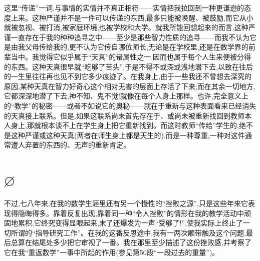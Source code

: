 这里“传递”一词,与事情的实情并不真正相符——实情把我拉回到一种更谦逊的态度上来。这种严谨并不是一件可以传递的东西,最多只能被唤醒、被鼓励,而它从小就被忽视、被打消,被家庭环境,也被学校和大学。就我所能回想起来的而言,这种严谨一直存在于我的种种追寻之中——至少是那些智力性质的追寻——而我不认为它是由我父母传给我的,更不认为它传自哪位师长,无论是在学校里,还是在数学界的前辈当中。我觉得它似乎属于“天真”的诸属性之一,因而也属于每个人生来便被分得的东西。这种天真很早就“吃够了苦头”,于是不得不或深或浅地潜下去,以致在往后的一生里往往再也见不到它多少痕迹了。在我身上,由于一些我还不曾想去深究的原因,某种天真在智力好奇心这个相对无害的层面上存活了下来;而在其余一切地方,它都深深地潜了下去,神不知、鬼不觉!就像在每个人身上那样。也许,完全意义上的“教学”的秘密——或者不如说它的奥秘——就在于重新与这种表面看来已经消失的天真接上联系。但是,如果这联系尚未首先存在于、或尚未被重新找回到教师本人身上,那就根本谈不上在学生身上把它重新找到。而这时教师“传给”学生的,绝不是这种严谨或这种天真(两者在师生身上都是天生的),而是一种尊重,一种对这件通常遭人弃置的东西的、无声的重新肯定。

\section{$\varnothing$}

不过,七八年来,在我的数学生涯里还有另一个慢性的“挫败之源”,只是这些年来它表现得隐晦得多。靠着反复出现,靠着同一种“令人挫败”的情形在我的教学活动中顽固地累积,它终究变得显眼起来,末了还爆发为一声“受够了!”,使我实际上终止了一切所谓的“指导研究工作”。在我的这番反思途中,我有一两次顺带触及这个问题,最后总算在结尾处多少把它审视了一番。我在那里至少描述了这份挫败感,并考察了它在我“重返数学”一事中所起的作用(参见第50段“一段过去的重量”)。
